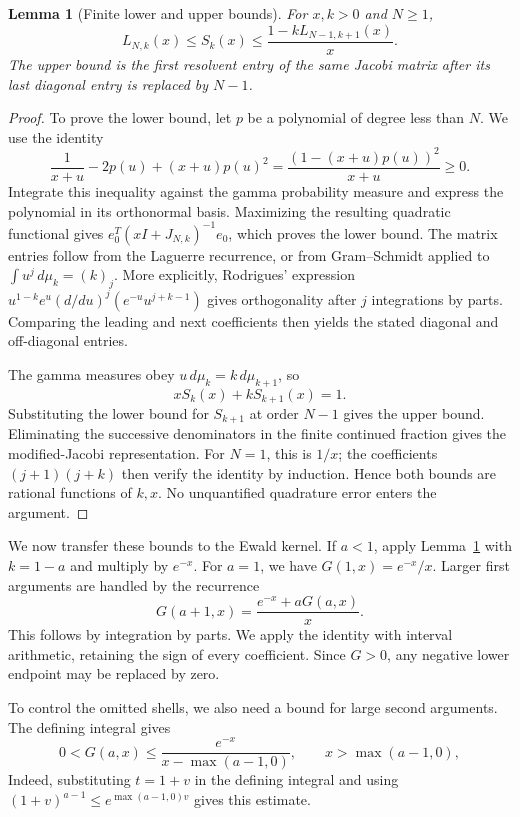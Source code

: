 \documentclass[reqno,english]{amsart}
\newtheorem{lemma}[theorem]{Lemma}
\theoremstyle{definition}
\newtheorem{open problem}[theorem]{Open Problem}
\theoremstyle{remark}
\theoremstyle{plain}
\numberwithin{equation}{section}
\begin{document}
\begin{lemma}[Finite lower and upper bounds]\label{E:lem:stieltjes}
For $x,k>0$ and $N\ge1$,
\begin{equation}
 L_{N,k}(x)\le S_k(x)\le\frac{1-kL_{N-1,k+1}(x)}x.
 \label{E:eq:stieltjes-bounds}
\end{equation}
The upper bound is the first resolvent entry of the same Jacobi matrix after its last diagonal entry is replaced by $N-1$.
\end{lemma}
\begin{proof}
To prove the lower bound, let $p$ be a polynomial of degree less than
$N$. We use the identity
\[
 \frac1{x+u}-2p(u)+(x+u)p(u)^2
 =\frac{(1-(x+u)p(u))^2}{x+u}\ge0.
\]
Integrate this inequality against the gamma probability measure
and express the polynomial in its orthonormal basis. Maximizing the
resulting quadratic functional gives
$e_0^T(xI+J_{N,k})^{-1}e_0$, which proves the lower bound.
The matrix entries follow from the Laguerre recurrence, or from
Gram--Schmidt applied to $\int u^j\,d\mu_k=(k)_j$.
More explicitly, Rodrigues' expression
$u^{1-k}e^u(d/du)^j(e^{-u}u^{j+k-1})$ gives orthogonality after
$j$ integrations by parts. Comparing the leading and next coefficients
then yields the stated diagonal and off-diagonal entries.

The gamma measures obey $u\,d\mu_k=k\,d\mu_{k+1}$, so
\[
 xS_k(x)+kS_{k+1}(x)=1.
\]
Substituting the lower bound for $S_{k+1}$ at order $N-1$ gives
the upper bound. Eliminating the successive denominators in the finite
continued fraction gives the modified-Jacobi representation. For
$N=1$, this is $1/x$; the coefficients $(j+1)(j+k)$ then verify
the identity by induction. Hence both bounds are rational functions
of $k,x$. No unquantified quadrature error enters the argument.
\end{proof}

We now transfer these bounds to the Ewald kernel. If $a<1$, apply
Lemma~\ref{E:lem:stieltjes} with $k=1-a$ and multiply by $e^{-x}$.
For $a=1$, we have $G(1,x)=e^{-x}/x$. Larger first arguments are
handled by the recurrence
\begin{equation}
 G(a+1,x)=\frac{e^{-x}+aG(a,x)}x.
 \label{E:eq:G-recurrence}
\end{equation}
This follows by integration by parts. We apply the identity with
interval arithmetic, retaining the sign of every coefficient.
Since $G>0$, any negative lower endpoint may be replaced by zero.


To control the omitted shells, we also need a bound for large second
arguments. The defining integral gives
\begin{equation}
 0<G(a,x)\le\frac{e^{-x}}{x-\max(a-1,0)},\qquad x>\max(a-1,0),
 \label{E:eq:G-large-x}
\end{equation}
Indeed, substituting $t=1+v$ in the defining integral and using
$(1+v)^{a-1}\le e^{\max(a-1,0)v}$ gives this estimate.
\end{document}
